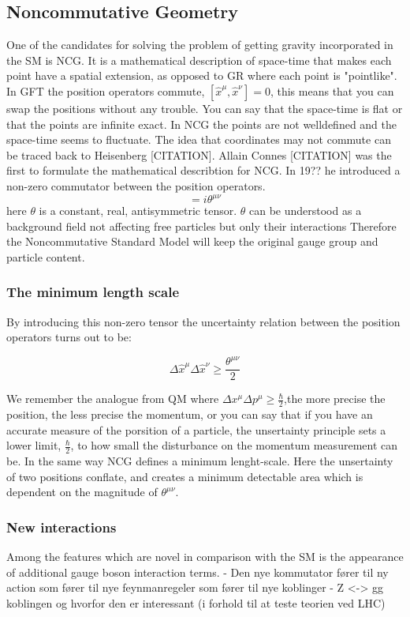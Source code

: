 \subsection{Noncommutative Geometry}
One of the candidates for solving the problem of getting gravity incorporated in the SM is NCG. It is a mathematical description of space-time that makes each point have a spatial extension, as opposed to GR where each point is "pointlike". In GFT the position operators commute, $[ \hat x^{\mu}, \hat x^{\nu}] = 0$, this means that you can swap the positions without any trouble. You can say that the space-time is flat or that the points are infinite exact. In NCG the points are not welldefined and the space-time seems to fluctuate. The idea that coordinates may not commute can be traced back to Heisenberg [CITATION]. Allain Connes [CITATION] was the first to formulate the mathematical describtion for NCG. In 19?? he introduced a non-zero commutator between the position operators.
\begin{equation}
[ \hat x^{\mu}, \hat x^{\nu}] = i \theta^{\mu \nu}
\end{equation}
here 	$\theta$ is a constant, real, antisymmetric tensor. $\theta$ can be understood as a background field not affecting free particles but only their interactions Therefore the Noncommutative Standard Model will keep the original gauge group and particle content.


\subsubsection{The minimum length scale}
By introducing this non-zero tensor the uncertainty relation between the position operators turns out to be:

\begin{equation}
\Delta \hat x^{\mu} \Delta \hat x^{\nu} \ge \frac{\theta^{\mu \nu}}{2}
\end{equation}

We remember the analogue from QM where $\Delta x^{\mu} \Delta p^{\mu} \ge \frac{\hbar}{2}$,the more precise the position, the less precise the momentum, or you can say that if you have an accurate measure of the porsition of a particle, the unsertainty principle sets a lower limit, $\frac{\hbar}{2}$, to how small the disturbance on the momentum measurement can be. In the same way NCG defines a minimum lenght-scale. Here the unsertainty of two positions conflate, and creates a minimum detectable area which is dependent on the magnitude of $\theta^{\mu \nu}$.

\subsubsection{New interactions}
Among the features which are novel in comparison with the SM is the appearance of additional gauge 
boson interaction terms.
- Den nye kommutator fører til ny action som fører til nye feynmanregeler som fører til nye koblinger
- Z <-> gg koblingen og hvorfor den er interessant (i forhold til at teste teorien ved LHC)


